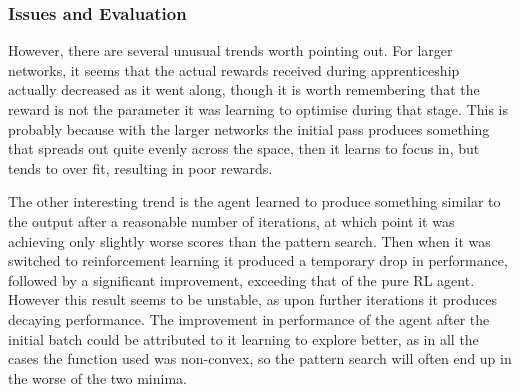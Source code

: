 %
%

\subsubsection{Issues and Evaluation}
 However, there are several unusual trends worth pointing out. For larger networks, it seems that the actual rewards received during apprenticeship actually decreased as it went along, though it is worth remembering that the reward is not the parameter it was learning to optimise during that stage. This is probably because with the larger networks the initial pass produces something that spreads out quite evenly across the space, then it learns to focus in, but tends to over fit, resulting in poor rewards.

The other interesting trend is the agent learned to produce something similar to the output after a reasonable number of iterations, at which point it was achieving only slightly worse scores than the pattern search. Then when it was switched to reinforcement learning it produced a temporary drop in performance, followed by a significant improvement, exceeding that of the pure RL agent. However this result seems to be unstable, as upon further iterations it produces decaying performance. The improvement in performance of the agent after the initial batch could be attributed to it learning to explore better, as in all the cases the function used was non-convex, so the pattern search will often end up in the worse of the two minima.

